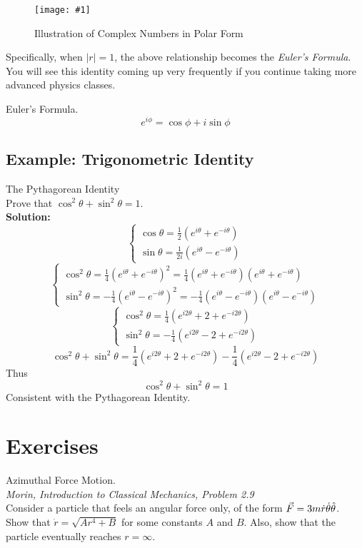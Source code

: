 \documentclass[11pt]{article}
\newcommand{\fig}[4]{
    \begin{figure}[H]
        \centering
        \texttt{[image: \#1]}
        \caption{#2}
        \label{exp4fit}
    \end{figure}
}
\theoremstyle{gangnamstyle}{\newtheorem{definition}{Definition}[]}
\theoremstyle{gangnamstyle}{\newtheorem{example}{Example}[]}
\theoremstyle{gangnamstyle}{\newtheorem{problem}{Problem}[]}
\begin{document}
\fig{figs/n0/complex.jpeg}{Illustration of Complex Numbers in Polar Form}{0.1}{0}

Specifically, when $|r| = 1$, the above relationship becomes the \textit{Euler's Formula}. You will see this identity coming up very frequently if you continue taking more advanced physics classes. 
\begin{definition}
Euler's Formula. \\
\begin{equation}
e^{i\phi} = \cos\phi + i\sin\phi
\end{equation}
\end{definition}

\subsection{Example: Trigonometric Identity}
\begin{example}
The Pythagorean Identity \\
Prove that $\cos^2\theta + \sin^2\theta = 1$. \\

\textbf{Solution:} 
\[ \begin{cases}
\cos\theta = \frac{1}{2}(e^{i\theta} + e^{-i\theta}) \\
\sin\theta = \frac{1}{2i}(e^{i\theta} - e^{-i\theta})
\end{cases} \]
\[ \begin{cases}
\cos^2\theta = \frac{1}{4}(e^{i\theta} + e^{-i\theta})^2 = \frac{1}{4}(e^{i\theta} + e^{-i\theta})(e^{i\theta} + e^{-i\theta}) \\
\sin^2\theta = -\frac{1}{4}(e^{i\theta} - e^{-i\theta})^2 = -\frac{1}{4}(e^{i\theta} - e^{-i\theta})(e^{i\theta} - e^{-i\theta})
\end{cases} \]
\[ \begin{cases}
\cos^2\theta = \frac{1}{4}(e^{i2\theta} + 2 + e^{-i2\theta}) \\
\sin^2\theta = -\frac{1}{4}(e^{i2\theta} - 2 + e^{-i2\theta})
\end{cases} \]
\[ \cos^2\theta + \sin^2\theta = \frac{1}{4}(e^{i2\theta} + 2 + e^{-i2\theta}) -\frac{1}{4}(e^{i2\theta} - 2 + e^{-i2\theta}) \]
Thus
\[ \cos^2\theta + \sin^2\theta = 1 \]
Consistent with the Pythagorean Identity.
\end{example}

\pagebreak

\section{Exercises}
\begin{problem}
Azimuthal Force Motion. \\
\textit{Morin, Introduction to Classical Mechanics, Problem 2.9} \\
Consider a particle that feels an angular force only, of the form $\Vec{F} = 3m\Dot{r}\Dot{\theta}\Hat{\theta}$. Show that $\Dot{r} = \sqrt{Ar^4 + B}$ for some constants $A$ and $B$. Also, show that the particle eventually reaches $r = \infty$. 
\end{problem}
\end{document}
